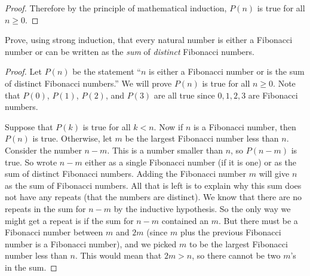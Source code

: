 \begin{questions}
\begin{solution}
\begin{proof}
    Therefore by the principle of mathematical induction, $P(n)$ is true for all $n \ge 0$.
  \end{proof}

\end{solution}



\question Prove, using strong induction, that every natural number is either a Fibonacci number or can be written as the \emph{sum} of \emph{distinct} Fibonacci numbers.

	\begin{solution}
		\begin{proof}
			Let $P(n)$ be the statement ``$n$ is either a Fibonacci number or is the sum of distinct Fibonacci numbers.''  We will prove $P(n)$ is true for all $n \ge 0$.  Note that $P(0)$, $P(1)$, $P(2)$, and $P(3)$ are all true since $0, 1, 2, 3$ are Fibonacci numbers.  
			
			Suppose that $P(k)$ is true for all $k < n$.  Now if $n$ is a Fibonacci number, then $P(n)$ is true.  Otherwise, let $m$ be the largest Fibonacci number less than $n$.  Consider the number $n - m$.  This is a number smaller than $n$, so $P(n-m)$ is true.  So wrote $n-m$ either as a single Fibonacci number (if it is one) or as the sum of distinct Fibonacci numbers.  Adding the Fibonacci number $m$ will give $n$ as the sum of Fibonacci numbers.  All that is left is to explain why this sum does not have any repeats (that the numbers are distinct).  We know that there are no repeats in the sum for $n-m$ by the inductive hypothesis.  So the only way we might get a repeat is if the sum for $n-m$ contained an $m$.  But there must be a Fibonacci number between $m$ and $2m$ (since $m$ plus the previous Fibonacci number is a Fibonacci number), and we picked $m$ to be the largest Fibonacci number less than $n$.  This would mean that $2m > n$, so there cannot be two $m$'s in the sum.
		\end{proof}
	\end{solution}


\end{questions}
